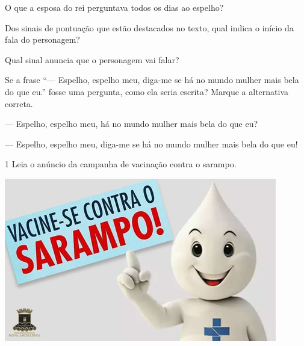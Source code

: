 \begin{escolha}
\item
  O que a esposa do rei perguntava todos os dias ao espelho?



\item
  Dos sinais de pontuação que estão destacados no texto, qual indica o
  início da fala do personagem?


\item
  Qual sinal anuncia que o personagem vai falar?


\item Se a frase ``--- Espelho, espelho meu, diga-me se há no mundo mulher
mais bela do que eu.'' fosse uma pergunta, como ela seria escrita?
Marque a alternativa correta.

\begin{boxlist}
 --- Espelho, espelho meu, há no mundo mulher mais bela do que eu?

 --- Espelho, espelho meu, diga-me se há no mundo mulher mais bela do que eu!
\end{boxlist}
\end{escolha}


\num{1} Leia o anúncio da campanha de vacinação contra o sarampo.


\includegraphics[width=4.68681in,height=2.81736in]{./media/image7.jpeg}

